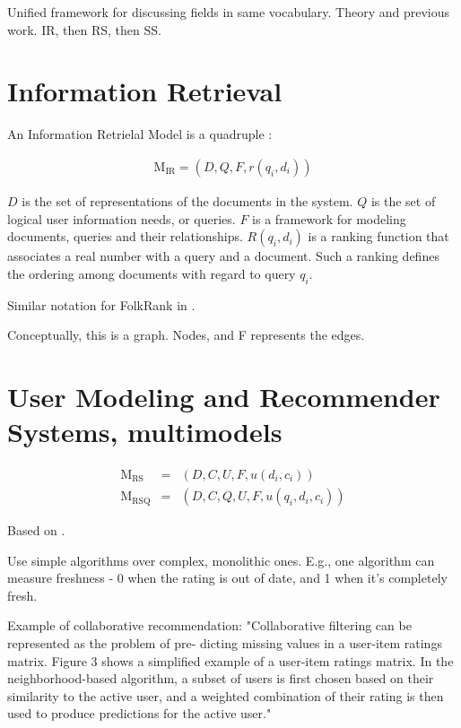 Unified framework for discussing fields in same vocabulary.
Theory and previous work.
IR, then RS, then SS.


\section{Information Retrieval}

An Information Retrielal Model is a quadruple \citep[p23]{Baeza-Yates1999}:

\begin{eqnarray}
  \mathrm{M_{IR}} = (D, Q, F, r(q_i, d_i))
\end{eqnarray}

$D$ is the set of representations of the documents in the system. $Q$ is the set of logical user information needs, or queries.
$F$ is a framework for modeling documents, queries and their relationships.
$R(q_i, d_i)$ is a ranking function that associates a real number with a query and a document.
Such a ranking defines the ordering among documents with regard to query $q_i$.

Similar notation for FolkRank in \cite[p4]{Hotho}.

Conceptually, this is a graph.
Nodes, and F represents the edges.


\section{User Modeling and Recommender Systems, multimodels}

\begin{eqnarray}
  \mathrm{M_{RS}}   &=& (D, C, U, F,    u(d_i, c_i))\\
  \mathrm{M_{RSQ}}  &=& (D, C, Q, U, F, u(q_i, d_i, c_i))
\end{eqnarray}

Based on \cite[p2]{Adomavicius2005}.

Use simple algorithms over complex, monolithic ones. E.g., one algorithm can measure freshness - 0 when the rating is out of date, and 1 when it's completely fresh.

\cite[p5]{Sugiyama2004} Example of collaborative recommendation: 
"Collaborative filtering can be represented as the problem of pre- dicting missing values in a user-item ratings matrix. Figure 3 shows a simplified example of a user-item ratings matrix.
In the neighborhood-based algorithm, a subset of users is first chosen based on their similarity to the active user, and a weighted combination of their rating is then used to produce predictions for the active user."

